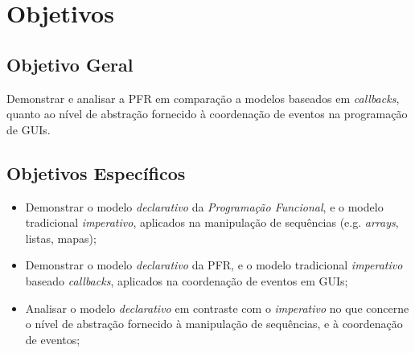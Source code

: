 \section{Objetivos}
\label{sec:objetivos}

\subsection{Objetivo Geral}

Demonstrar e analisar a PFR em comparação a modelos baseados em
\emph{callbacks}, quanto ao nível de abstração fornecido à coordenação de
eventos na programação de GUIs.

\subsection{Objetivos Específicos}

\begin{itemize}[noitemsep]
  \item Demonstrar o modelo \emph{declarativo} da \emph{Programação Funcional},
    e o modelo tradicional \emph{imperativo}, aplicados na manipulação de
    sequências (e.g. \emph{arrays}, listas, mapas);
  \item Demonstrar o modelo \emph{declarativo} da PFR, e o modelo tradicional
    \emph{imperativo} baseado \emph{callbacks}, aplicados na coordenação de
    eventos em GUIs;
  \item Analisar o modelo \emph{declarativo} em contraste com o
    \emph{imperativo} no que concerne o nível de abstração fornecido à
    manipulação de sequências, e à coordenação de eventos;
\end{itemize}


